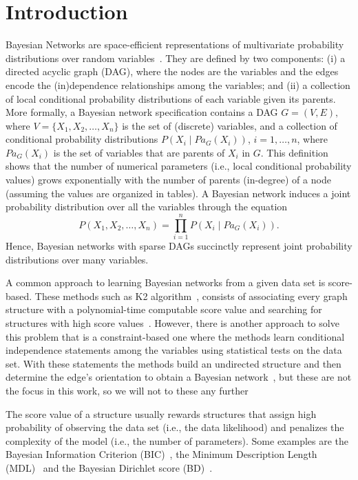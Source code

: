 \section{Introduction}
\label{sec:introduction}

Bayesian Networks are space-efficient representations of multivariate probability distributions over random variables~\cite{VJensen01}. They are defined by two components: (i) a directed acyclic graph (DAG), where the nodes are the variables and the edges encode the (in)dependence relationships among the variables; and (ii) a collection of local conditional probability distributions of each variable given its parents. More formally, a Bayesian network specification contains a DAG \( G = ( V , E ), \) where $V = \{ X_1 , X_2 , \ldots , X_n \}$ is the set of (discrete) variables, and a collection of conditional probability distributions \( P( X_i \mid {Pa}_G( X_i ) ) \), $i=1,\ldots,n$, where ${Pa}_G( X_i )$ is the set of variables that are parents of $X_i$ in $G$. This definition shows that the number of numerical parameters (i.e., local conditional probability values) grows exponentially with the number of parents (in-degree) of a node (assuming the values are organized in tables). A Bayesian network induces a joint probability distribution over all the variables through the equation
	\begin{equation}
		\label{eq:jointdist}
		P( X_1 , X_2 , \ldots , X_n ) = \prod_{i=1}^{n} P( X_i \mid {Pa}_G( X_i ) ).
	\end{equation}
Hence, Bayesian networks with sparse DAGs succinctly represent joint probability distributions over many variables.

A common approach to learning Bayesian networks from a given data set is score-based. These methods such as K2 algorithm~\cite{Cooper92}, consists of associating every graph structure with a polynomial-time computable score value and searching for structures with high score values~\cite{Margaritis03}. However, there is another approach to solve this problem that is a constraint-based one where the methods learn conditional independence statements among the variables using statistical tests on the data set. With these statements the methods build an undirected structure and then determine the edge's orientation to obtain a Bayesian network~\cite{Spirtes95}, but these are not the focus in this work, so we will not to these any further

The score value of a structure usually rewards structures that assign high probability of observing the data set (i.e., the data likelihood) and penalizes the complexity of the model (i.e., the number of parameters). Some examples are the Bayesian Information Criterion (BIC)~\cite{BIC91}, the Minimum Description Length (MDL)~\cite{MDL94} and the Bayesian Dirichlet score (BD)~\cite{BD95}.

